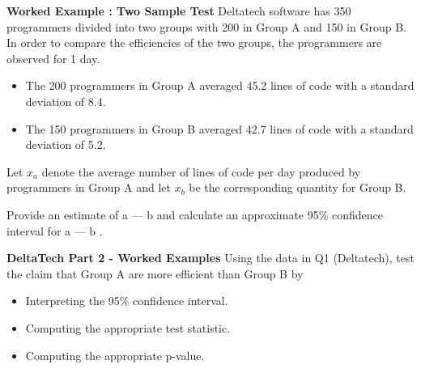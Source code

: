 \documentclass[]{report}
\begin{document}
	
	\item \textbf{Worked Example : Two Sample Test} Deltatech software has 350 programmers divided into two groups with 200 in Group A and 150 in Group B. In order to compare the efficiencies of the two groups, the programmers are observed for  1 day.
	
	\begin{itemize}
		\item  The 200 programmers in Group A averaged 45.2 lines of code with a standard deviation of 8.4.
		
		\item The 150 programmers in Group B averaged 42.7 lines of code with a standard deviation of 5.2.
		
	\end{itemize}
	
	
	Let $x_a$ denote the average number of lines of code per day produced by programmers in Group A and
	let $x_b$ be the corresponding quantity for Group B.
	
	Provide an estimate of a — b and calculate an approximate 95\% confidence interval for a — b .
	
	\item \textbf{DeltaTech Part 2 - Worked Examples} 
	Using the data in Q1 (Deltatech), test the claim that Group A are more efficient than Group B by
	\begin{itemize}
		\item 	Interpreting the 95\% confidence interval.
		\item Computing the appropriate test statistic.
		\item Computing the appropriate p-value.
	\end{itemize}
\end{document}
